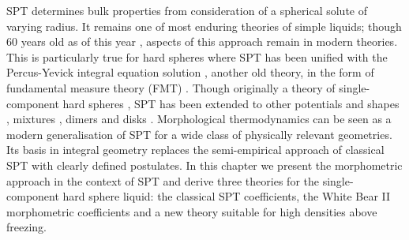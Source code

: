 \documentclass[11pt,twoside]{report}
\begin{document}
SPT determines bulk properties from consideration of a spherical solute of varying radius.
It remains one of most enduring theories of simple liquids; though 60 years old as of this year \cite{ReissJCP1959}, aspects of this approach remain in modern theories.
This is particularly true for hard spheres where SPT has been unified with the Percus-Yevick integral equation solution \cite{WertheimPRL1963}, another old theory, in the form of fundamental measure theory (FMT) \cite{RosenfeldPRL1989}.
Though originally a theory of single-component hard spheres \cite{ReissJCP1959}, SPT has been extended to other potentials \cite{ReissJCP1960,HelfandJCP1960,ReissJCP1961} and shapes \cite{GibbonsMP1969,GibbonsMP1970}, mixtures \cite{LebowitzJCP1965}, dimers \cite{StillingerJCP2006,ChatterjeeJCP2006} and disks \cite{HelfandJCP1961,MartinJCP2018,Hansen-GoosJCP2019}.
Morphological thermodynamics can be seen as a modern generalisation of SPT for a wide class of physically relevant geometries.
Its basis in integral geometry replaces the semi-empirical approach of classical SPT with clearly defined postulates.
In this chapter we present the morphometric approach in the context of SPT and derive three theories for the single-component hard sphere liquid: the classical SPT coefficients, the White Bear II morphometric coefficients and a new theory suitable for high densities above freezing.

\end{document}
